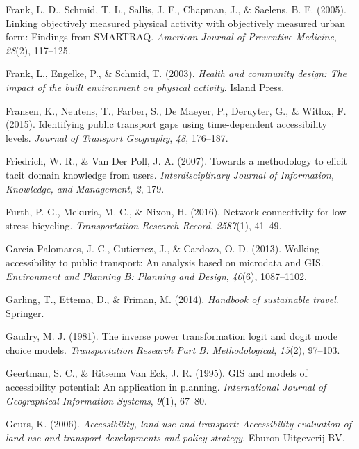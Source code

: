 \documentclass[
11pt, %
oneside, %
english, %
singlespacing, %
]{macthesis} %
\newlength{\cslhangindent}
\newenvironment{CSLReferences}[2] %
{\begin{list}{}{%
	\setlength{\itemindent}{0pt}
	\setlength{\leftmargin}{0pt}
	\setlength{\parsep}{0pt}
	\ifodd #1
	\setlength{\leftmargin}{\cslhangindent}
	\setlength{\itemindent}{-1\cslhangindent}
	\fi
	\setlength{\itemsep}{#2\baselineskip}}}
{\end{list}}
\begin{document}
\begin{CSLReferences}{1}{0}
Frank, L. D., Schmid, T. L., Sallis, J. F., Chapman, J., \& Saelens, B. E. (2005). Linking objectively measured physical activity with objectively measured urban form: Findings from SMARTRAQ. \emph{American Journal of Preventive Medicine}, \emph{28}(2), 117--125.

Frank, L., Engelke, P., \& Schmid, T. (2003). \emph{Health and community design: The impact of the built environment on physical activity}. Island Press.

Fransen, K., Neutens, T., Farber, S., De Maeyer, P., Deruyter, G., \& Witlox, F. (2015). Identifying public transport gaps using time-dependent accessibility levels. \emph{Journal of Transport Geography}, \emph{48}, 176--187.

Friedrich, W. R., \& Van Der Poll, J. A. (2007). Towards a methodology to elicit tacit domain knowledge from users. \emph{Interdisciplinary Journal of Information, Knowledge, and Management}, \emph{2}, 179.

Furth, P. G., Mekuria, M. C., \& Nixon, H. (2016). Network connectivity for low-stress bicycling. \emph{Transportation Research Record}, \emph{2587}(1), 41--49.

Garcia-Palomares, J. C., Gutierrez, J., \& Cardozo, O. D. (2013). Walking accessibility to public transport: An analysis based on microdata and GIS. \emph{Environment and Planning B: Planning and Design}, \emph{40}(6), 1087--1102.

Garling, T., Ettema, D., \& Friman, M. (2014). \emph{Handbook of sustainable travel}. Springer.

Gaudry, M. J. (1981). The inverse power transformation logit and dogit mode choice models. \emph{Transportation Research Part B: Methodological}, \emph{15}(2), 97--103.

Geertman, S. C., \& Ritsema Van Eck, J. R. (1995). GIS and models of accessibility potential: An application in planning. \emph{International Journal of Geographical Information Systems}, \emph{9}(1), 67--80.

Geurs, K. (2006). \emph{Accessibility, land use and transport: Accessibility evaluation of land-use and transport developments and policy strategy}. Eburon Uitgeverij BV.


\end{CSLReferences}
\end{document}
